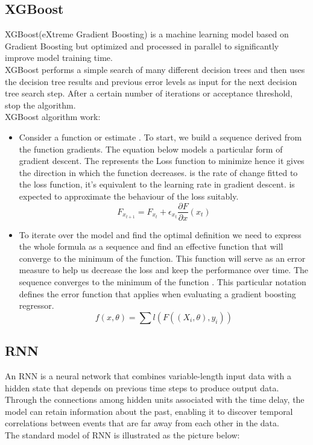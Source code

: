 \documentclass[conference]{IEEEtran}
\begin{document}
\subsection{XGBoost}
XGBoost(eXtreme Gradient Boosting) is a machine learning model based on Gradient Boosting but optimized and processed in parallel to significantly improve model training time.\\
XGBoost performs a simple search of many different decision trees and then uses the decision tree results and previous error levels as input for the next decision tree search step. After a certain number of iterations or acceptance threshold, stop the algorithm. \cite{XGBoost}\\
XGBoost algorithm work:
\begin{itemize}
    \item Consider a function or estimate . To start, we build a sequence derived from the function gradients. The equation below models a particular form of gradient descent. The represents the Loss function to minimize hence it gives the direction in which the function decreases. is the rate of change fitted to the loss function, it’s equivalent to the learning rate in gradient descent. is expected to approximate the behaviour of the loss suitably.
    \[F_{x_{t+1}} = F_{x_t} + \epsilon_{x_t} \frac{\partial F}{\partial x}(x_t)\]
    \item To iterate over the model and find the optimal definition we need to express the whole formula as a sequence and find an effective function that will converge to the minimum of the function. This function will serve as an error measure to help us decrease the loss and keep the performance over time. The sequence converges to the minimum of the function . This particular notation defines the error function that applies when evaluating a gradient boosting regressor.
    \[f(x, \theta) = \sum l(F((X_i, \theta), y_i))\]
\end{itemize}


\subsection{RNN}
An RNN is a neural network that combines variable-length input data with a hidden state that depends on previous time steps to produce output data. Through the connections among hidden units associated with the time delay, the model can retain information about the past, enabling it to discover temporal correlations between events that are far away from each other in the data. \cite{RNN}\\
The standard model of RNN is illustrated as the picture below: \\
\end{document}
